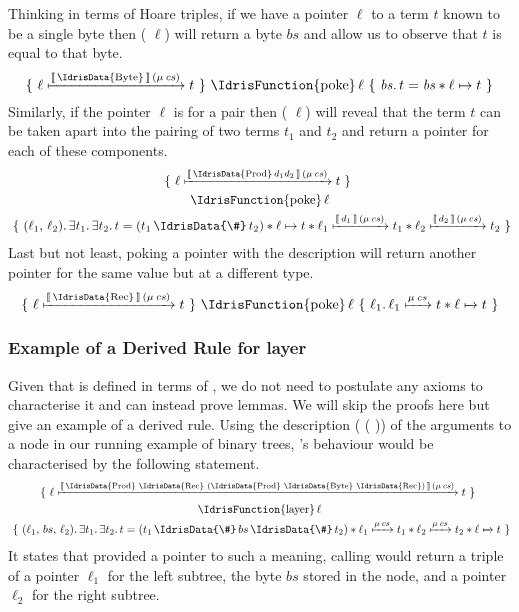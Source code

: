 Thinking in terms of Hoare triples, if we have a pointer
$\ell$ to a term $t$ known to be a single byte then
( $\ell$)
will return a byte $bs$ and allow us to observe that $t$ is
equal to that byte.
\[
\Hoare
    {\Pointer{\ell}{\Meaning{\text{\IdrisData{Byte}}}{cs}}{t}}
    {\text{\IdrisFunction{poke}}\,\ell}
    {\mathit{bs}}
    {t = \mathit{bs} \ast \ell \mapsto t}
\]
Similarly, if the pointer $\ell$ is for a pair then
( $\ell$) will
reveal that the term $t$ can be taken apart into the pairing
of two terms $t_1$ and $t_2$ and
return a pointer for each of these components.
\begin{gather*}
\Hoare
    {\Pointer{\ell}{\Meaning{\text{\IdrisData{Prod}}\, d_1 d_2}{cs}}{t}}
    {\\\text{\IdrisFunction{poke}}\,\ell\\}
    {(\ell_1,\, \ell_2)}
    {\exists t_1.\, \exists t_2.\, t = (t_1 \,\text{\IdrisData{\#}}\, t_2)
        \ast \ell \mapsto t \ast \Pointer{\ell_1}{\Meaning{d_1}{cs}}{t_1} \ast \Pointer{\ell_2}{\Meaning{d_2}{cs}}{t_2}}
\end{gather*}
Last but not least, poking a pointer with the 
description will return another pointer for the same value but
at a different type.
\[
\Hoare
    {\Pointer{\ell}{\Meaning{\text{\IdrisData{Rec}}}{cs}}{t}}
    {\text{\IdrisFunction{poke}}\,\ell}
    {\ell_1}
    {\Pointer{\ell_1}{\Mu{cs}}{t} \ast \Pointer{\ell}{}{t}}
\]

\subsubsection{Example of a Derived Rule for layer}

Given that  is defined in terms of ,
we do not need to postulate any axioms to characterise it and can instead
prove lemmas.
%
We will skip the proofs here but give an example of a derived rule.
%
Using the description (  (  ))
of the arguments to a node in our running example of binary trees,
's behaviour would be characterised by the following
statement.
\begin{gather*}
\Hoare
    {\Pointer{\ell}{\Meaning{\text{\IdrisData{Prod} \IdrisData{Rec} (\IdrisData{Prod} \IdrisData{Byte} \IdrisData{Rec})}}{cs}}{t}}
    {\\\text{\IdrisFunction{layer}}\,\ell\\}
    {(\ell_1,\, bs,\, \ell_2)}
    {\exists t_1.\, \exists t_2.\,
      t = (t_1 \,\text{\IdrisData{\#}}\, bs \,\text{\IdrisData{\#}}\, t_2)
      \ast \Pointer{\ell_1}{\Mu{cs}}{t_1}
      \ast \Pointer{\ell_2}{\Mu{cs}}{t_2}
      \ast \Pointer{\ell}{}{t}}
\end{gather*}
It states that provided a pointer to such a meaning,
calling  would
return a triple of
a pointer $\ell_1$ for the left subtree,
the byte $\mathit{bs}$ stored in the node,
and a pointer $\ell_2$ for the right subtree.

